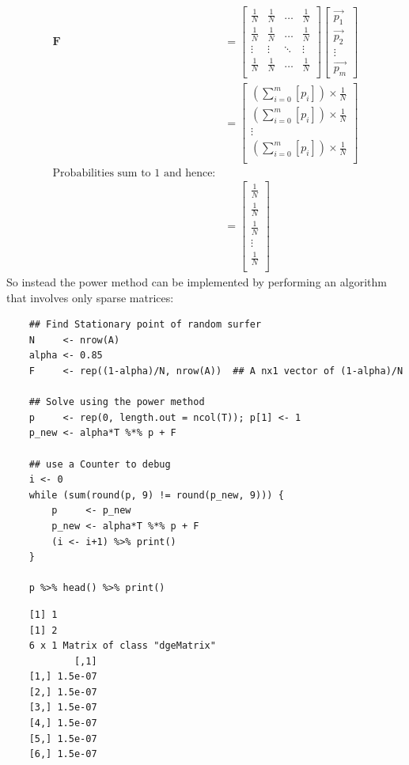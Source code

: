 \documentclass[11pt, twoside]{report}
\begin{document}
\begin{align}
\mathbf{F} &=
\begin{bmatrix}
\frac{1}{N} & \frac{1}{N} & \ldots & \frac{1}{N} \\
\frac{1}{N} & \frac{1}{N} & \ldots & \frac{1}{N} \\
\vdots      & \vdots      & \ddots & \vdots \\
\frac{1}{N} & \frac{1}{N} & \ldots & \frac{1}{N} \\
\end{bmatrix} \label{eq:bgVal2}
\begin{bmatrix}
\vec{p_1} \\ \vec{p_2} \\ \vdots \\ \vec{p_m}
\end{bmatrix}  \\
&= \begin{bmatrix}
\left( \sum^{m}_{i= 0}   \left[ p_i \right]  \right) \times \frac{1}{N} \\
\left( \sum^{m}_{i= 0}   \left[ p_i \right]  \right) \times \frac{1}{N} \\
\vdots  \\
\left( \sum^{m}_{i= 0}   \left[ p_i \right]  \right) \times \frac{1}{N} \\
\end{bmatrix}  \\
 \text{Probabilities sum to 1 and hence:} \\
&= \begin{bmatrix}
\frac{1}{N} \\
\frac{1}{N} \\
\frac{1}{N} \\
\vdots  \\
\frac{1}{N} \\
\end{bmatrix}
\end{align}
So instead the power method can be implemented by performing an algorithm that involves only sparse matrices:

\begin{tcolorbox}
    \begin{verbatim}
    ## Find Stationary point of random surfer
    N     <- nrow(A)
    alpha <- 0.85
    F     <- rep((1-alpha)/N, nrow(A))  ## A nx1 vector of (1-alpha)/N

    ## Solve using the power method
    p     <- rep(0, length.out = ncol(T)); p[1] <- 1
    p_new <- alpha*T %*% p + F

    ## use a Counter to debug
    i <- 0
    while (sum(round(p, 9) != round(p_new, 9))) {
        p     <- p_new
        p_new <- alpha*T %*% p + F
        (i <- i+1) %>% print()
    }

    p %>% head() %>% print()
    \end{verbatim}
\tcblower
    \begin{verbatim}
    [1] 1
    [1] 2
    6 x 1 Matrix of class "dgeMatrix"
            [,1]
    [1,] 1.5e-07
    [2,] 1.5e-07
    [3,] 1.5e-07
    [4,] 1.5e-07
    [5,] 1.5e-07
    [6,] 1.5e-07
    \end{verbatim}
\end{tcolorbox}
\end{document}
